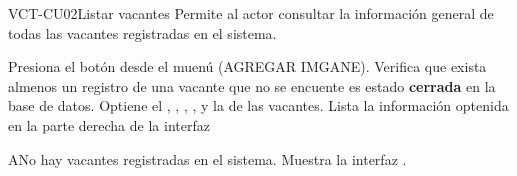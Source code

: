 \begin{UseCase}[]{VCT-CU02}{Listar vacantes}{
	Permite al actor consultar la información general de todas las vacantes registradas en el sistema.
	}
\end{UseCase}

\begin{UCtrayectoria}
	\UCpaso [\UCactor] Presiona el botón  desde el muenú (AGREGAR IMGANE).
    \UCpaso [\UCsist] Verifica que exista almenos un registro de una vacante que no se encuente es estado \textbf{cerrada} en la base de datos.
	\UCpaso [\UCsist] Optiene el , , 
	, , y la   de las vacantes.
	\UCpaso [\UCsist] Lista la información optenida en la parte derecha de la interfaz 
\end{UCtrayectoria}

\begin{UCtrayectoriaA}{A}{No hay vacantes registradas en el sistema.}
	\UCpaso [\UCsist] Muestra la interfaz .
\end{UCtrayectoriaA}

